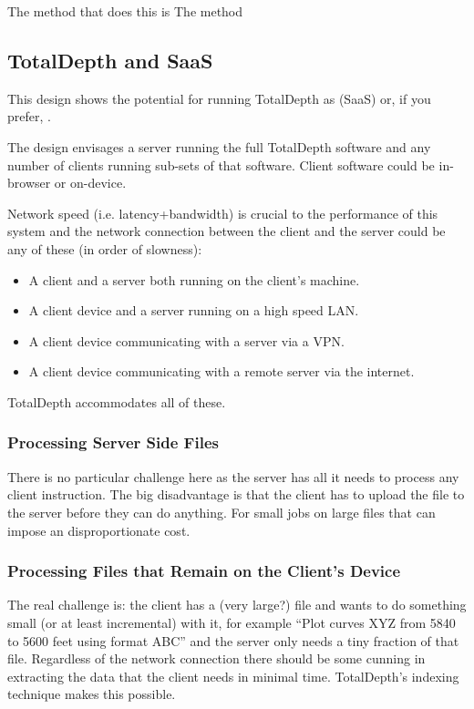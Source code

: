 \documentclass[letterpaper,10pt,english]{sphinxmanual}
\begin{document}
The method that does this is The  method


\subsection{TotalDepth and SaaS}
\label{\detokenize{tech/saas:totaldepth-and-saas}}\label{\detokenize{tech/saas::doc}}
This design shows the potential for running TotalDepth as  (SaaS) or, if you prefer, .

The design envisages a server running the full TotalDepth software and any number of clients running sub-sets of that software. Client software could be in-browser or on-device.

Network speed (i.e. latency+bandwidth) is crucial to the performance of this system and the network connection between the client and the server could be any of these (in order of slowness):
\begin{itemize}
\item {} 
A client and a server both running on the client’s machine.

\item {} 
A client device and a server running on a high speed LAN.

\item {} 
A client device communicating with a server via a VPN.

\item {} 
A client device communicating with a remote server via the internet.

\end{itemize}

TotalDepth accommodates all of these.


\subsubsection{Processing Server Side Files}
\label{\detokenize{tech/saas:processing-server-side-files}}
There is no particular challenge here as the server has all it needs to process any client instruction. The big disadvantage is that the client has to upload the file to the server before they can do anything. For small jobs on large files that can impose an disproportionate cost.


\subsubsection{Processing Files that Remain on the Client’s Device}
\label{\detokenize{tech/saas:processing-files-that-remain-on-the-client-s-device}}
The real challenge is: the client has a (very large?) file and wants to do something small (or at least incremental) with it, for example “Plot curves XYZ from 5840 to 5600 feet using format ABC” and the server only needs a tiny fraction of that file. Regardless of the network connection there should be some cunning in extracting the data that the client needs in minimal time. TotalDepth’s indexing technique makes this possible.
\end{document}
